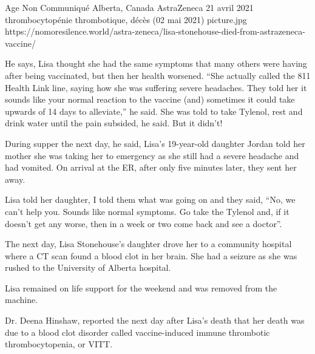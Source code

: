           {Age Non Communiqué}
          {Alberta, Canada}
          {AstraZeneca}
          {21 avril 2021}
          {thrombocytopénie thrombotique,
            décès (02 mai 2021)}
          {picture.jpg}
          {https://nomoresilence.world/astra-zeneca/lisa-stonehouse-died-from-astrazeneca-vaccine/}
          {

He says, Lisa thought she had the same symptoms that many others were having
after being vaccinated, but then her health worsened. “She actually called the
811 Health Link line, saying how she was suffering severe headaches. They told
her it sounds like your normal reaction to the vaccine (and) sometimes it could
take upwards of 14 days to alleviate,” he said. She was told to take Tylenol,
rest and drink water until the pain subsided, he said. But it didn’t!

During supper the next day, he said, Lisa’s 19-year-old daughter Jordan told her
mother she was taking her to emergency as she still had a severe headache and
had vomited. On arrival at the ER, after only five minutes later, they sent her
away.

Lisa told her daughter, I told them what was going on and they said, “No, we
can’t help you. Sounds like normal symptoms. Go take the Tylenol and, if it
doesn’t get any worse, then in a week or two come back and see a doctor”.

The next day, Lisa Stonehouse’s daughter drove her to a community hospital where
a CT scan found a blood clot in her brain. She had a seizure as she was rushed
to the University of Alberta hospital.

Lisa remained on life support for the weekend and was removed from the machine.

Dr. Deena Hinshaw, reported the next day after Lisa’s death that her death was
due to a blood clot disorder called vaccine-induced immune thrombotic
thrombocytopenia, or VITT.

}
